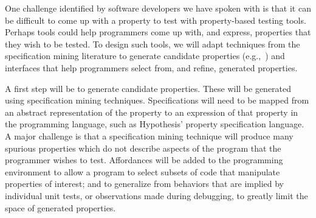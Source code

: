 

One challenge identified by software developers we have spoken with is that it can be difficult to come up with a property to test with property-based testing tools. Perhaps tools could help programmers come up with, and express, properties that they wish to be tested. To design such tools, we will adapt techniques from the specification mining literature to generate candidate properties (e.g.,~\cite{ammons2002mining,le2018deep}) and interfaces that help programmers select from, and refine, generated properties.

A first step will be to generate candidate properties. These will be generated using specification mining techniques. Specifications will need to be mapped from an abstract representation of the property to an expression of that property in the programming language, such as Hypothesis' property specification language. A major challenge is that a specification mining technique will produce many spurious properties which do not describe aspects of the program that the programmer wishes to test. Affordances will be added to the programming environment to allow a program to select subsets of code that manipulate properties of interest; and to generalize from behaviors that are implied by individual unit tests, or observations made during debugging, to greatly limit the space of generated properties.

